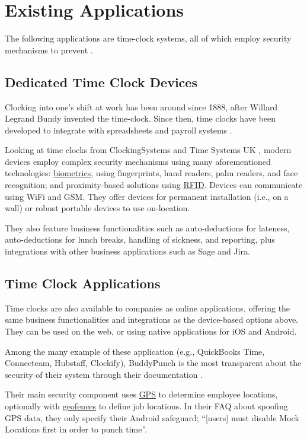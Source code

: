\section{Existing Applications}

The following applications are \gls{time-clock} systems,
all of which employ security mechanisms to prevent
.

\subsection{Dedicated Time Clock Devices}

Clocking into one's shift at work has been around since
1888, after Willard Legrand Bundy invented the
\gls{time-clock}.
Since then, time clocks have been developed to integrate
with spreadsheets and payroll systems
\parencite{clockingHistory}.

Looking at time clocks from ClockingSystems
\parencite{clockingSystems} and Time Systems UK
\parencite{timeSystemsUk}, modern devices employ complex
security mechanisms using many aforementioned technologies:
\hyperref[ss:biometrics]{biometrics}, using fingerprints,
hand readers, palm readers, and face recognition; and
proximity-based solutions using \hyperref[ss:rfid]{RFID}.
Devices can communicate using WiFi and GSM.
They offer devices for permanent installation (i.e., on a
wall) or robust portable devices to use on-location.

They also feature business functionalities such as
auto-deductions for lateness, auto-deductions for lunch
breaks, handling of sickness, and reporting, plus
integrations with other business applications such as Sage
and Jira.

\subsection{Time Clock Applications}

Time clocks are also available to companies as online
applications, offering the same business functionalities
and integrations as the device-based options above.
They can be used on the web, or using native applications
for iOS and Android.

Among the many example of these application (e.g.,
QuickBooks Time, Connecteam, Hubstaff, Clockify),
BuddyPunch is the most transparent about the security of
their system through their documentation
\parencite{buddyPunchDocs}.

Their main security component uses \hyperref[ss:gps]{GPS}
to determine employee locations, optionally with
\hyperref[ss:geofencing]{geofences} to define job
locations.
In their FAQ about spoofing GPS data, they only specify
their Android safeguard; \enquote{[users] must disable Mock
  Locations first in order to punch time}.


